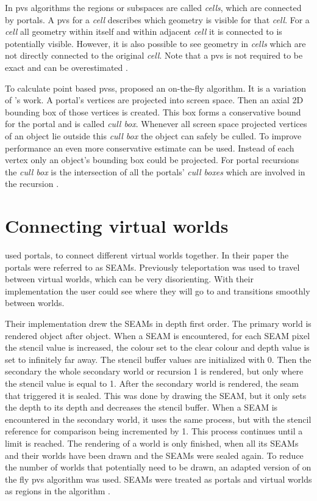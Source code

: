 In \gls{pvs} algorithms the regions or subspaces are called \textit{cells}, which are connected by portals. A \gls{pvs} for a \textit{cell} describes which geometry is visible for that \textit{cell}. For a \textit{cell} all geometry within itself and within adjacent \textit{cell} it is connected to is potentially visible. However, it is also possible to see geometry in \textit{cells} which are not directly connected to the original \textit{cell}. Note that a \gls{pvs} is not required to be exact and can be overestimated \cite{cohen:2003:survey}.

To calculate point based \glspl{pvs}, \textcite{luebke:1995:portals} proposed an on-the-fly algorithm. It is a variation of \textcite{jones:1971:new}'s work. A portal's vertices are projected into screen space. Then an axial 2D bounding box of those vertices is created. This box forms a conservative bound for the portal and is called \textit{cull box}. Whenever all screen space projected vertices of an object lie outside this \textit{cull box} the object can safely be culled. To improve performance an even more conservative estimate can be used. Instead of each vertex only an object's bounding box could be projected. For portal recursions the \textit{cull box} is the intersection of all the portals' \textit{cull boxes} which are involved in the recursion \cite{luebke:1995:portals}. 



\section{Connecting virtual worlds}

\textcite{schmalstieg:1999:sewing} used portals, to connect different virtual worlds together. In their paper the portals were referred to as SEAMs. Previously teleportation was used to travel between virtual worlds, which can be very disorienting. With their implementation the user could see where they will go to and transitions smoothly between worlds.


Their implementation drew the SEAMs in depth first order. The primary world is rendered object after object. When a SEAM is encountered, for each SEAM pixel the stencil value is increased, the colour set to the clear colour and depth value is set to infinitely far away. The stencil buffer values are initialized with 0. Then the secondary the whole secondary world or recursion 1 is rendered, but only where the stencil value is equal to 1. After the secondary world is rendered, the seam that triggered it is sealed. This was done by drawing the SEAM, but it only sets the depth to its depth and decreases the stencil buffer. When a SEAM is encountered in the secondary world, it uses the same process, but with the stencil reference for comparison being incremented by 1. This process continues until a limit is reached. The rendering of a world is only finished, when all its SEAMs and their worlds have been drawn and the SEAMs were sealed again. To reduce the number of worlds that potentially need to be drawn, an adapted version of \textcite{luebke:1995:portals} on the fly \gls{pvs} algorithm was used. SEAMs were treated as portals and virtual worlds as regions in the algorithm \cite{schmalstieg:1999:sewing}.

